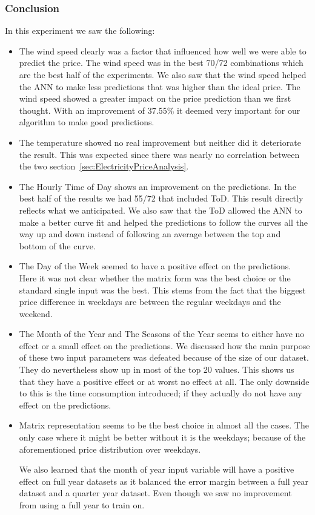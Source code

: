 \subsubsection{Conclusion}
In this experiment we saw the following:
\begin{itemize}
	\item The wind speed clearly was a factor that influenced how well we were able to predict the price. The wind speed was in the best 70/72 combinations which are the best half of the experiments. We also saw that the wind speed helped the ANN to make less predictions that was higher than the ideal price. The wind speed showed a greater impact on the price prediction than we first thought. With an improvement of 37.55\% it deemed very important for our algorithm to make good predictions.
	\item The temperature showed no real improvement but neither did it deteriorate the result. This was expected since there was nearly no correlation between the two section~\ref{sec:ElectricityPriceAnalysis}.
	\item The Hourly Time of Day shows an improvement on the predictions. In the best half of the results we had 55/72 that included ToD. This result directly reflects what we anticipated. We also saw that the ToD allowed the ANN to make a better curve fit and helped the predictions to follow the curves all the way up and down instead of following an average between the top and bottom of the curve.
	\item The Day of the Week seemed to have a positive effect on the predictions. Here it was not clear whether the matrix form was the best choice or the standard single input was the best. This stems from the fact that the biggest price difference in weekdays are between the regular weekdays and the weekend.
	\item The Month of the Year and The Seasons of the Year seems to either have no effect or a small effect on the predictions. We discussed how the main purpose of these two input parameters was defeated because of the size of our dataset. They do nevertheless show up in most of the top 20 values. This shows us that they have a positive effect or at worst no effect at all. The only downside to this is the time consumption introduced; if they actually do not have any effect on the predictions.
	\item Matrix representation seems to be the best choice in almost all the cases. The only case where it might be better without it is the weekdays; because of the aforementioned price distribution over weekdays.

We also learned that the month of year input variable will have a positive effect on full year datasets as it balanced the error margin between a full year dataset and a quarter year dataset. Even though we saw no improvement from using a full year to train on.
\end{itemize}

